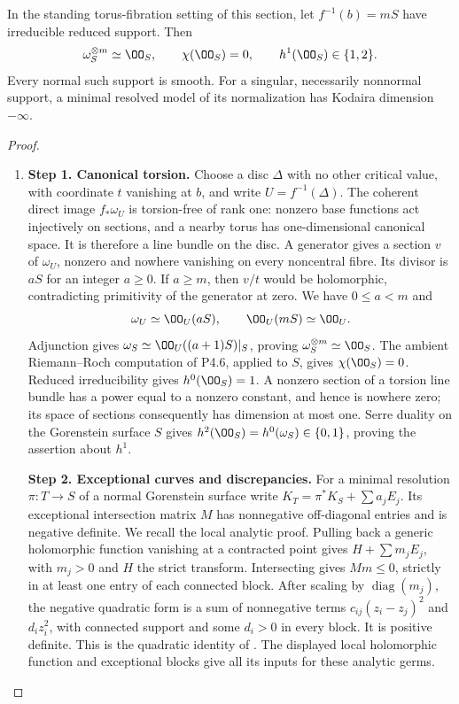 \begin{proposition}[P4.12]\hypertarget{tag-02WJ}{}\label{night:P4.12}\label{stmt:P4.12}

In the standing torus-fibration setting of this section, let $f^{-1}(b)=mS$
have irreducible reduced support. Then
\[
 \omega_S^{\otimes m}\simeq\OO_S,\qquad
 \chi(\OO_S)=0,\qquad h^1(\OO_S)\in\{1,2\}.
\]
Every normal such support is smooth. For a singular, necessarily
nonnormal support, a minimal resolved model of its normalization
has Kodaira dimension $-\infty$.
\end{proposition}
\begin{proof}
\begin{enumerate}[label={$\langle1\rangle$\arabic*.},leftmargin=*]
\item 
\noindent\textbf{Step 1. Canonical torsion.}
Choose a disc $\Delta$ with no other critical value, with coordinate
$t$ vanishing at $b$, and write $U=f^{-1}(\Delta)$. The coherent
direct image $f_*\omega_U$ is torsion-free of rank one: nonzero
base functions act injectively on sections, and a nearby torus has
one-dimensional canonical space. It is therefore a line bundle
on the disc. A generator gives a section $v$ of $\omega_U$,
nonzero and nowhere vanishing on every noncentral fibre. Its
divisor is $aS$ for an integer $a\ge0$. If $a\ge m$, then $v/t$
would be holomorphic, contradicting primitivity of the generator
at zero. We have $0\le a<m$ and
\[
 \omega_U\simeq\OO_U(aS),\qquad\OO_U(mS)\simeq\OO_U.
\]
Adjunction gives $\omega_S\simeq\OO_U((a+1)S)|_S$, proving
$\omega_S^{\otimes m}\simeq\OO_S$. The ambient
Riemann--Roch computation of P4.6, applied to $S$, gives
$\chi(\OO_S)=0$. Reduced irreducibility gives $h^0(\OO_S)=1$.
A nonzero section of a torsion line bundle has a power equal to
a nonzero constant, and hence is nowhere zero; its space of
sections consequently has dimension at most one. Serre duality
on the Gorenstein surface $S$ gives
$h^2(\OO_S)=h^0(\omega_S)\in\{0,1\}$, proving the assertion
about $h^1$.

\noindent\textbf{Step 2. Exceptional curves and discrepancies.}
For a minimal resolution $\pi:T\to S$ of a normal Gorenstein
surface write $K_T=\pi^*K_S+\sum a_jE_j$. Its exceptional
intersection matrix $M$ has nonnegative off-diagonal entries
and is negative definite. We recall the local analytic proof.
Pulling back a generic holomorphic function vanishing at a
contracted point gives $H+\sum m_jE_j$, with $m_j>0$ and $H$
the strict transform. Intersecting gives $Mm\le0$, strictly in
at least one entry of each connected block. After scaling by
$\operatorname{diag}(m_j)$, the negative quadratic form is a
sum of nonnegative terms $c_{ij}(z_i-z_j)^2$ and $d_i z_i^2$,
with connected support and some $d_i>0$ in every block. It is
positive definite. This is the quadratic identity of
\cite[\S I, unnumbered assertion and proof, p.~6]{Mumford1961}.
The displayed local holomorphic function and exceptional blocks give
all its inputs for these analytic germs.


\end{enumerate}
\end{proof}
